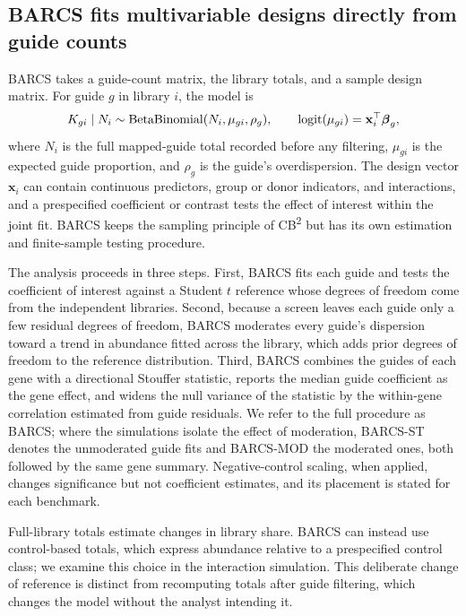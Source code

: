 \subsection{BARCS fits multivariable designs directly from guide counts}
\label{sec:overview}

BARCS takes a guide-count matrix, the library totals, and a sample design
matrix.  For guide $g$ in library $i$, the model is
\begin{equation}
K_{gi}\mid N_i\sim
\operatorname{BetaBinomial}(N_i,\mu_{gi},\rho_g),
\qquad
\operatorname{logit}(\mu_{gi})=\mathbf{x}_i^\top\boldsymbol{\beta}_g,
\label{eq:barcs-model}
\end{equation}
where $N_i$ is the full mapped-guide total recorded before any filtering,
$\mu_{gi}$ is the expected guide proportion, and $\rho_g$ is the guide's
overdispersion.  The design vector $\mathbf{x}_i$ can contain continuous
predictors, group or donor indicators, and interactions, and a prespecified
coefficient or contrast tests the effect of interest within the joint fit.
BARCS keeps the sampling principle of CB\textsuperscript{2}
\citep{jeong2019beta} but has its own estimation and finite-sample testing
procedure.

The analysis proceeds in three steps.  First, BARCS fits each guide and tests
the coefficient of interest against a Student $t$ reference whose degrees of
freedom come from the independent libraries.  Second, because a screen leaves
each guide only a few residual degrees of freedom, BARCS moderates every
guide's dispersion toward a trend in abundance fitted across the library,
which adds prior degrees of freedom to the reference distribution.  Third,
BARCS combines the guides of each gene with a directional Stouffer statistic,
reports the median guide coefficient as the gene effect, and widens the null
variance of the statistic by the within-gene correlation estimated from guide
residuals.  We refer to the full procedure as BARCS; where the simulations
isolate the effect of moderation, BARCS-ST denotes the unmoderated guide fits
and BARCS-MOD the moderated ones, both followed by the same gene summary.
Negative-control scaling, when applied, changes significance but not
coefficient estimates, and its placement is stated for each benchmark.

Full-library totals estimate changes in library share.  BARCS can instead use
control-based totals, which express abundance relative to a prespecified
control class; we examine this choice in the interaction simulation.  This
deliberate change of reference is distinct from recomputing totals after
guide filtering, which changes the model without the analyst intending it.
